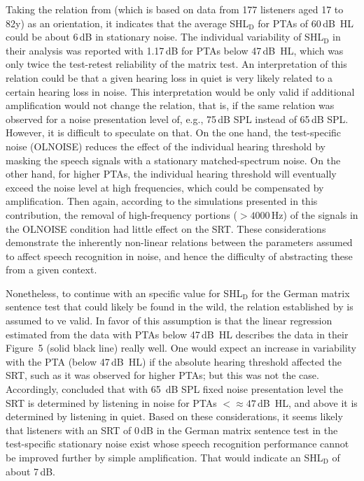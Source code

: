 \documentclass[10pt,a4paper,twocolumn]{article}
\begin{document}
Taking the relation from \cite{wardenga2015} (which is based on data from 177 listeners aged 17 to 82y) as an orientation, it indicates that the average SHL$_\text{D}$ for PTAs of 60\,dB~HL could be about 6\,dB in stationary noise.
%
The individual variability of SHL$_\text{D}$ in their analysis was reported with 1.17\,dB for PTAs below 47\,dB~HL, which was only twice the test-retest reliability of the matrix test.
%
An interpretation of this relation could be that a given hearing loss in quiet is very likely related to a certain hearing loss in noise.
%
This interpretation would be only valid if additional amplification would not change the relation, that is, if the same relation was observed for a noise presentation level of, e.g., 75\,dB SPL instead of 65\,dB SPL.
%
However, it is difficult to speculate on that.
%
On the one hand, the test-specific noise (OLNOISE) reduces the effect of the individual hearing threshold by masking the speech signals with a stationary matched-spectrum noise.
%
On the other hand, for higher PTAs, the individual hearing threshold will eventually exceed the noise level at high frequencies, which could be compensated by amplification.
%
Then again, according to the simulations presented in this contribution, the removal of high-frequency portions ($>4000$\,Hz) of the signals in the OLNOISE condition had little effect on the SRT.
%
These considerations demonstrate the inherently non-linear relations between the parameters assumed to affect speech recognition in noise, and hence the difficulty of abstracting these from a given context.

Nonetheless, to continue with an specific value for SHL$_\text{D}$ for the German matrix sentence test that could likely be found in the wild, the relation established by \cite{wardenga2015} is assumed to ve valid.
%
In favor of this assumption is that the linear regression estimated from the data with PTAs below 47\,dB~HL describes the data in their Figure~5 (solid black line) really well.
%
One would expect an increase in variability with the PTA (below 47\,dB~HL) if the absolute hearing threshold affected the SRT, such as it was observed for higher PTAs; but this was not the case.
%
Accordingly, \cite{wardenga2015} concluded that with 65~dB SPL fixed noise presentation level the SRT is determined by listening in noise for PTAs $<\approx47$\,dB~HL, and above it is determined by listening in quiet.
%
Based on these considerations, it seems likely that listeners with an SRT of 0\,dB in the German matrix sentence test in the test-specific stationary noise exist whose speech recognition performance cannot be improved further by simple amplification.
%
That would indicate an SHL$_\text{D}$ of about 7\,dB.
\end{document}
